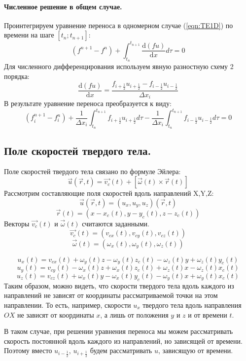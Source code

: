 \documentclass[10pt,a4paper]{article}
\begin{document}
\paragraph{Численное решение в общем случае.}
Проинтегрируем уравнение переноса в одномерном случае (\ref{eqn:TE1D}) по времени на шаге $[t_n; t_{n+1}]$:
\[
(f^{n+1}-f^n)+\int_{t_n}^{t_{n+1}}\frac{\text{d}(f u)}{\text{d}x}d\tau=0
\]
Для численного дифференцирования используем явную разностную схему 2 порядка:
\[
\frac{\text{d}(f u)}{\text{d}x}=\frac{f_{i+\frac{1}{2}}u_{i+\frac{1}{2}}-f_{i-\frac{1}{2}}u_{i-\frac{1}{2}}}{\Delta x_i}
\]
В результате уравнение переноса преобразуется к виду:
\begin{equation}
\label{eqn:TE1DdiffScheme}
(f_i^{n+1}-f_i^n)
+
\frac{1}{\Delta x_i}
\int_{t_n}^{t_{n+1}}
f_{i+\frac{1}{2}}u_{i+\frac{1}{2}}d\tau
-
\frac{1}{\Delta x_i}
\int_{t_n}^{t_{n+1}}
f_{i-\frac{1}{2}}u_{i-\frac{1}{2}} d\tau
=0
\end{equation}

\subsection{Поле скоростей твердого тела.}
Поле скоростей твердого тела связано по формуле Эйлера:
\[
\overrightarrow{u}(\overrightarrow{r},t)=\overrightarrow{v_c}(t)+[\overrightarrow{\omega}(t)\times \overrightarrow{r}(t)]
\]
Рассмотрим составляющие поля скоростей вдоль направлений X,Y,Z:
\[ \overrightarrow{u}(\overrightarrow{r},t)=(u_x, u_y, u_z)(\overrightarrow{r},t) \]
\[ \overrightarrow{r}(t)=(x-x_c(t), y-y_c(t), z-z_c(t)) \]
Векторы $\overrightarrow{v_c}(t)$ и $\overrightarrow{\omega}(t)$ считаются заданными.
\[ \overrightarrow{v_c}(t)=(v_{cx}(t), v_{cy}(t), v_{cz}(t)) \]
\[ \overrightarrow{\omega}(t)=(\omega_x(t), \omega_y(t), \omega_z(t)) \]

\[ u_x(t)=v_{cx}(t)+\omega_y(t)z-\omega_y(t)z_c(t)-\omega_z(t)y+\omega_z(t)y_c(t) \]
\[ u_y(t)=v_{cy}(t)-\omega_x(t)z+\omega_x(t)z_c(t)+\omega_z(t)x-\omega_z(t)x_c(t) \]
\[ u_z(t)=v_{cz}(t)+\omega_x(t)y-\omega_x(t)y_c(t)-\omega_y(t)x+\omega_y(t)x_c(t) \]
Таким образом, можно видеть, что скорости твердого тела вдоль каждого из направлений не зависят от координаты рассматриваемой точки на этом направлении. То есть, например, скорости $u_x$ твердого тела вдоль направления $OX$ не зависят от координаты $x$, а лишь от положения $y$ и $z$ и от времени $t$.

В таком случае, при решении уравнения переноса мы можем рассматривать скорость постоянной вдоль каждого из направлений, но зависящей от времени. Поэтому вместо $u_{i-\frac{1}{2}}$, $u_{i+\frac{1}{2}}$ будем рассматривать $u$, зависящую от времени.
\end{document}
